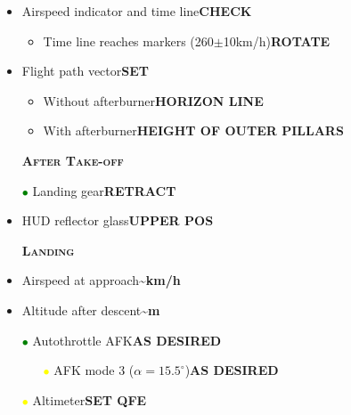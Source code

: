 \documentclass[a4paper,12pt,dvipsnames]{letter}
\newcommand{\button}[1]{\textbf{#1}}
\newcommand{\ok}[1]{\textcolor{Green}{\textbf{#1}}}
\newcommand{\myHead}[1]{{\LARGE\textsc{\textbf{#1}}}}
\newcommand{\bi}{\textcolor{ProcessBlue}{$\bullet$\;}}
\newcommand{\gi}{\textcolor{Green}{$\bullet$\;}}
\newcommand{\yi}{\textcolor{Yellow}{$\bullet$\;}}
\begin{document}
{\begin{itemize}
\begin{itemize}
  \item[\bi] Exhaust nozzle indicator\dotfill\ok{ZONE ACHIEVED}
  \item Pressure ratio\dotfill\button{CHECK}
  \begin{itemize}
   \item[\yi] Zone 2\dotfill\ok{\textgreater{}\,-\,1.9}
   \item[\yi] Zone 3\dotfill\ok{MAX POWER}
  \end{itemize}
 \end{itemize}
 \item Airspeed indicator and time line\dotfill\button{CHECK}
 \begin{itemize}
  \item Time line reaches markers (260$\pm$10\;km/h)\dotfill\button{ROTATE}
 \end{itemize}
 \item Flight path vector\dotfill\button{SET}
 \begin{itemize}
  \item Without afterburner\dotfill\button{HORIZON LINE}
  \item With afterburner\dotfill\button{HEIGHT OF OUTER PILLARS}
 \end{itemize}
\end{itemize}
\begin{itemize}
 \item [] \myHead{After Take-off}
 \item[\gi] Landing gear\dotfill\button{RETRACT}
 \item HUD reflector glass\dotfill\button{UPPER POS}
\end{itemize}
\newpage
\begin{itemize}
 \item [] \myHead{Landing}
 \item Airspeed at approach\dotfill\button{\textasciitilde{}\;km/h}
 \item Altitude after descent\dotfill\button{\textasciitilde{}\;m}
 \item[\gi] Autothrottle AFK\dotfill\button{AS DESIRED}
 \begin{itemize}
  \item[\yi] AFK mode 3 ($\alpha=15.5^\circ$)\dotfill\button{AS DESIRED}
 \end{itemize}
 \item[\yi] Altimeter\dotfill\button{SET QFE}

\end{itemize}}
\end{document}

